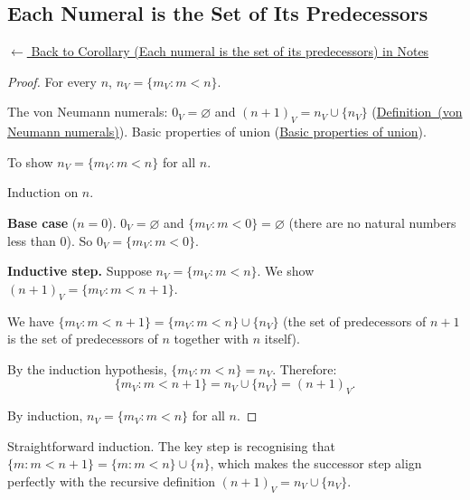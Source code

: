 
\subsection*{Each Numeral is the Set of Its Predecessors}
\label{prf:vn-predecessors}

\begin{remark*}[Return]
\hyperref[cor:vn-predecessors]{$\leftarrow$ Back to Corollary (Each numeral is the set of its predecessors) in Notes}
\end{remark*}

\begin{proof}
\Claim For every $n$, $n_V = \{m_V : m < n\}$.

\Given The von Neumann numerals: $0_V = \varnothing$ and $(n+1)_V = n_V \cup
\{n_V\}$ (\hyperref[def:vn-numerals]{Definition~(von Neumann numerals)}). Basic
properties of union (\hyperref[prop:union-basics]{Basic properties of union}).

\Goal To show $n_V = \{m_V : m < n\}$ for all $n$.

\Strategy Induction on $n$.

\medskip
\noindent\textbf{Base case} ($n = 0$). $0_V = \varnothing$ and $\{m_V : m < 0\}
= \varnothing$ (there are no natural numbers less than $0$). So $0_V = \{m_V :
m < 0\}$. \checkbox

\medskip
\noindent\textbf{Inductive step.} Suppose $n_V = \{m_V : m < n\}$. We show
$(n+1)_V = \{m_V : m < n+1\}$.

We have $\{m_V : m < n+1\} = \{m_V : m < n\} \cup \{n_V\}$ (the set of
predecessors of $n+1$ is the set of predecessors of $n$ together with $n$
itself).

By the induction hypothesis, $\{m_V : m < n\} = n_V$. Therefore:
\[
\{m_V : m < n+1\} = n_V \cup \{n_V\} = (n+1)_V.
\]
\checkbox

By induction, $n_V = \{m_V : m < n\}$ for all $n$. \AsReq
\end{proof}

\begin{remark*}
Straightforward induction. The key step is recognising that $\{m : m < n+1\} =
\{m : m < n\} \cup \{n\}$, which makes the successor step align perfectly with
the recursive definition $(n+1)_V = n_V \cup \{n_V\}$.
\end{remark*}

